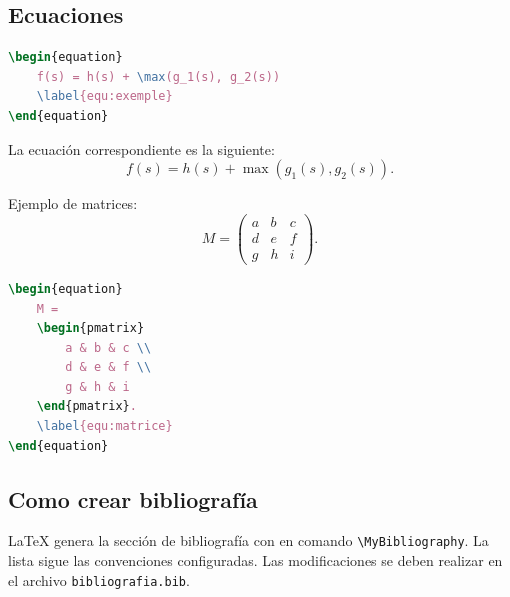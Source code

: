 \documentclass{ceri/sty/rapport}
\begin{document}
\subsection{Ecuaciones}
\label{sec:Equations}

\begin{lstlisting}[language=TeX,numbers=none]
\begin{equation}
	f(s) = h(s) + \max(g_1(s), g_2(s))
	\label{equ:exemple}
\end{equation}
\end{lstlisting}
La ecuación correspondiente es la siguiente:
\begin{equation}
	f(s) = h(s) + \max(g_1(s), g_2(s)).
	\label{equ:exemple}
\end{equation}

Ejemplo de matrices: 
\begin{equation}
	M = 
	\begin{pmatrix}
		a & b & c \\
		d & e & f \\
		g & h & i
	\end{pmatrix}.
	\label{equ:matrice}
\end{equation}

\begin{lstlisting}[language=TeX,numbers=none]
\begin{equation}
	M = 
	\begin{pmatrix}
		a & b & c \\
		d & e & f \\
		g & h & i
	\end{pmatrix}.
	\label{equ:matrice}
\end{equation}
\end{lstlisting}

\subsection{Como crear bibliografía}  
\LaTeX{} genera la sección de bibliografía con en comando \texttt{\textbackslash{}MyBibliography}. La lista sigue las convenciones configuradas. Las modificaciones se deben realizar en el archivo \texttt{bibliografia.bib}.


\MyBibliography
\end{document}
